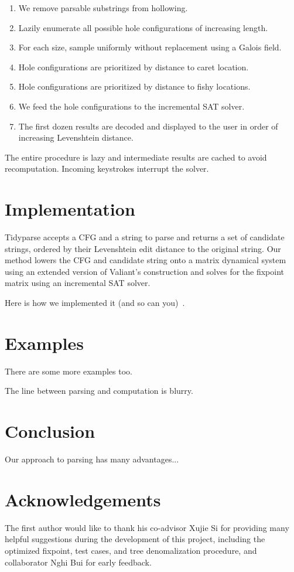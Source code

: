 \documentclass[sigplan,nonacm]{acmart}\settopmatter{printfolios=false,printccs=false,printacmref=false}
\begin{document}
\begin{enumerate}
  \item We remove parsable substrings from hollowing.
  \item Lazily enumerate all possible hole configurations of   increasing length.
  \item For each size, sample uniformly without replacement using a   Galois field.
  \item Hole configurations are prioritized by distance to caret   location.
  \item Hole configurations are prioritized by distance to fishy   locations.
  \item We feed the hole configurations to the incremental SAT solver.
  \item The first dozen results are decoded and displayed to the user in order of increasing Levenshtein distance.
\end{enumerate}

The entire procedure is lazy and intermediate results are cached to avoid recomputation. Incoming keystrokes interrupt the solver.

\section{Implementation}

Tidyparse accepts a CFG and a string to parse and returns a set of candidate strings, ordered by their Levenshtein edit distance to the original string. Our method lowers the CFG and candidate string onto a matrix dynamical system using an extended version of Valiant's construction and solves for the fixpoint matrix using an incremental SAT solver.

    Here is how we implemented it (and so can you)~\cite{valiant1975general}.
\section{Examples}
There are some more examples too.

The line between parsing and computation is blurry.

\section{Conclusion}

Our approach to parsing has many advantages...

\section{Acknowledgements}
The first author would like to thank his co-advisor Xujie Si for providing many helpful suggestions during the development of this project, including the optimized fixpoint, test cases, and tree denomalization procedure, and collaborator Nghi Bui for early feedback.


\end{document}
